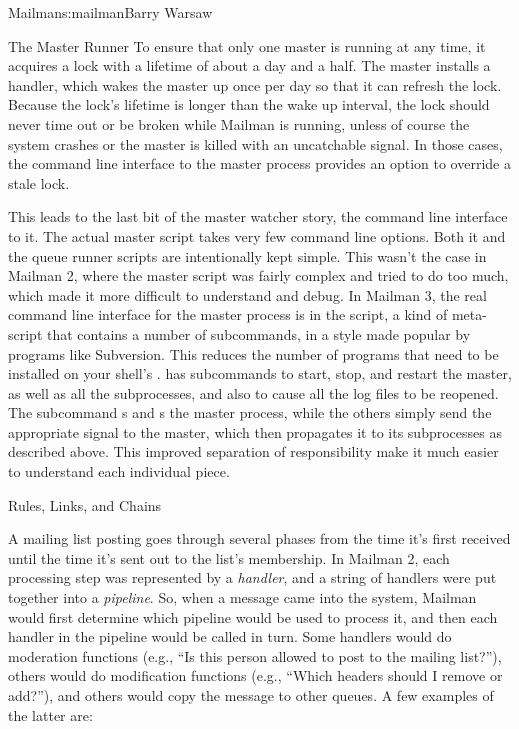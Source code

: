 \begin{aosachapter}{Mailman}{s:mailman}{Barry Warsaw}
\begin{aosasect1}{The Master Runner}
To ensure that only one master is running at any time, it acquires a
lock with a lifetime of about a day and a half.  The master installs a
 handler, which wakes the master up once per day so that
it can refresh the lock.  Because the lock's lifetime is longer than
the wake up interval, the lock should never time out or be broken
while Mailman is running, unless of course the system crashes or the
master is killed with an uncatchable signal.  In those cases, the
command line interface to the master process provides an option to
override a stale lock.

This leads to the last bit of the master watcher story, the command
line interface to it.  The actual master script takes very few command
line options.  Both it and the queue runner scripts are intentionally
kept simple.  This wasn't the case in Mailman 2, where the master
script was fairly complex and tried to do too much, which made it more
difficult to understand and debug.  In Mailman 3, the real command
line interface for the master process is in the 
script, a kind of meta-script that contains a number of subcommands,
in a style made popular by programs like Subversion.  This reduces the
number of programs that need to be installed on your shell's
.   has subcommands to start, stop, and
restart the master, as well as all the subprocesses, and also to cause
all the log files to be reopened.  The  subcommand
s and s the master process, while the others
simply send the appropriate signal to the master, which then
propagates it to its subprocesses as described above.  
This improved separation of responsibility make it much easier to
understand each individual piece.

\end{aosasect1}

\begin{aosasect1}{Rules, Links, and Chains}

A mailing list posting goes through several phases from the time it's
first received until the time it's sent out to the list's membership.
In Mailman 2, each processing step was represented by a
\emph{handler}, and a string of handlers were put together into a
\emph{pipeline}.  So, when a message came into the system, Mailman
would first determine which pipeline would be used to process it, and
then each handler in the pipeline would be called in turn.  Some
handlers would do moderation functions (e.g., ``Is this person allowed
to post to the mailing list?''), others would do modification
functions (e.g., ``Which headers should I remove or add?''), and
others would copy the message to other queues.  A few examples of the
latter are:


\end{aosasect1}
\end{aosachapter}
